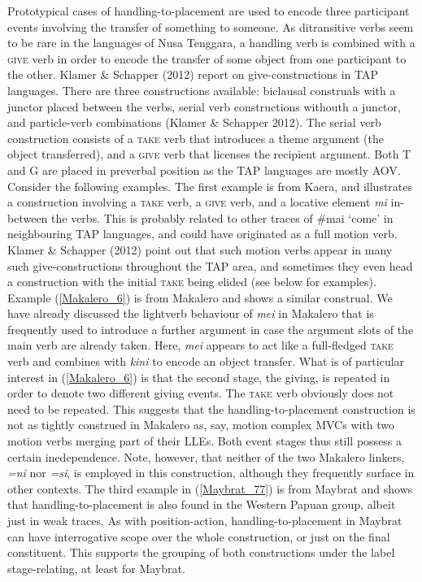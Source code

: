Prototypical cases of handling-to-placement are used to encode three participant events involving the transfer of something to someone. As ditransitive verbs seem to be rare in the languages of Nusa Tenggara, a handling verb is combined with a \textsc{give} verb in order to encode the transfer of some object from one participant to the other. Klamer \& Schapper (2012) report on give-constructions in TAP languages. There are three constructions available: biclausal construals with a junctor placed between the verbs, serial verb constructions withouth a junctor, and particle-verb combinations (Klamer \& Schapper 2012). The serial verb construction consists of a \textsc{take} verb that introduces a theme argument (the object transferred), and a \textsc{give} verb that licenses the recipient argument. Both T and G are placed in preverbal position as the TAP languages are mostly AOV. Consider the following examples. The first example is from Kaera, and illustrates a construction involving a \textsc{take} verb, a \textsc{give} verb, and a locative element \textit{mi} in-between the verbs. This is probably related to other traces of \#mai `come' in neighbouring TAP languages, and could have originated as a full motion verb. Klamer \& Schapper (2012) point out that such motion verbs appear in many such give-constructions throughout the TAP area, and sometimes they even head a construction with the initial \textsc{take} being elided (see below for examples). Example (\ref{Makalero_6}) is from Makalero and shows a similar construal. We have already discussed the lightverb behaviour of \textit{mei} in Makalero that is frequently used to introduce a further argument in case the argument slots of the main verb are already taken. Here, \textit{mei} appears to act like a full-fledged \textsc{take} verb and combines with \textit{kini} to encode an object transfer. What is of particular interest in (\ref{Makalero_6}) is that the second stage, the giving, is repeated in order to denote two different giving events. The \textsc{take} verb obviously does not need to be repeated. This suggests that the handling-to-placement construction is not as tightly construed in Makalero as, say, motion complex MVCs with two motion verbs merging part of their LLEs. Both event stages thus still possess a certain inedependence. Note, however, that neither of the two Makalero linkers, \textit{=ni} nor \textit{=si}, is employed in this construction, although they frequently surface in other contexts. The third example in (\ref{Maybrat_77}) is from Maybrat and shows that handling-to-placement is also found in the Western Papuan group, albeit just in weak traces. As with position-action, handling-to-placement in Maybrat can have interrogative scope over the whole construction, or just on the final constituent. This supports the grouping of both constructions under the label stage-relating, at least for Maybrat. 

